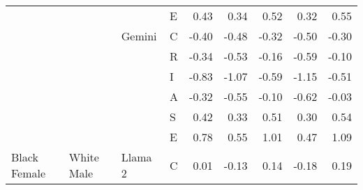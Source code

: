 \begin{table}
\begin{tabular}[t]{llllrrrrr}
 &  &  & E & 0.43 & 0.34 & 0.52 & 0.32 & 0.55\\

 &  & \multirow[t]{-6}{*}{\raggedright\arraybackslash Gemini} & C & -0.40 & -0.48 & -0.32 & -0.50 & -0.30\\

 &  &  & R & -0.34 & -0.53 & -0.16 & -0.59 & -0.10\\

 &  &  & I & -0.83 & -1.07 & -0.59 & -1.15 & -0.51\\

 &  &  & A & -0.32 & -0.55 & -0.10 & -0.62 & -0.03\\

 &  &  & S & 0.42 & 0.33 & 0.51 & 0.30 & 0.54\\

 &  &  & E & 0.78 & 0.55 & 1.01 & 0.47 & 1.09\\

\multirow[t]{-24}{*}{\raggedright\arraybackslash Black Female} & \multirow[t]{-24}{*}{\raggedright\arraybackslash White Male} & \multirow[t]{-6}{*}{\raggedright\arraybackslash Llama 2} & C & 0.01 & -0.13 & 0.14 & -0.18 & 0.19\\
\bottomrule
\end{tabular}
\end{table}
